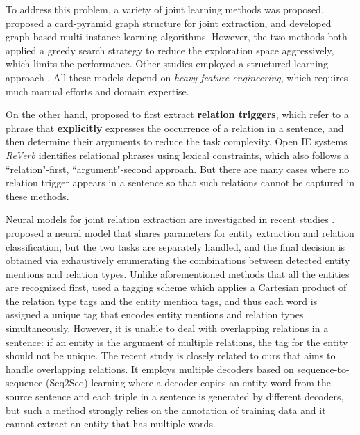 \documentclass[letterpaper]{article} %
\theoremstyle{definition}
\begin{document}
To address this problem, a variety of joint learning methods was proposed. \citeauthor{kate2010joint}  proposed a card-pyramid graph structure for joint extraction, and \citeauthor{hoffmann2011knowledge}  developed graph-based multi-instance learning algorithms. However, the two methods both applied a greedy search strategy to reduce the exploration space aggressively, which limits the performance. Other studies employed a structured learning approach \cite{li2014incremental,miwa2014modeling}. All these models depend on \textit{heavy feature engineering}, which requires much manual efforts and domain expertise. %

On the other hand, \citeauthor{bjorne2011extracting}  proposed to first extract \textbf{relation triggers}, which refer to a phrase that \textbf{explicitly} expresses the occurrence of a relation in a sentence, and then determine their arguments to reduce the task complexity. Open IE systems \textit{ReVerb} \cite{fader2011identifying} identifies relational phrases using lexical constraints, which also follows a ``relation"-first, ``argument"-second approach. But there are many cases where no relation trigger appears in a sentence so that such relations cannot be captured in these methods.

Neural models for joint relation extraction are investigated in recent studies \cite{katiyar2016investigating,zhang2017end}. \citeauthor{miwa2016end}  proposed a neural model that shares parameters for entity extraction and relation classification, but the two tasks are separately handled, and the final decision is obtained via exhaustively enumerating the combinations between detected entity mentions and relation types. Unlike aforementioned methods that all the entities are recognized first, \citeauthor{zheng2017joint}  used a tagging scheme which applies a Cartesian product of the relation type tags and the entity mention tags, and thus each word is assigned a unique tag that encodes entity mentions and relation types simultaneously. However, it is unable to deal with overlapping relations in a sentence: if an entity is the argument of multiple relations, the tag for the entity should not be unique.
The recent study \cite{zeng2018extracting} is closely related to ours that aims to handle overlapping relations. It employs multiple decoders based on sequence-to-sequence (Seq2Seq) learning where a decoder copies an entity word from the source sentence and each triple in a sentence is generated by different decoders, but such a method strongly relies on the annotation of training data and it cannot extract an entity that has multiple words.
\end{document}
